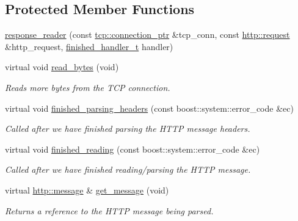 \subsection*{Protected Member Functions}
\begin{DoxyCompactItemize}
\item 
\hyperlink{classpion_1_1http_1_1response__reader_adb7aa322ee7f9073b748a28079935255}{response\-\_\-reader} (const \hyperlink{namespacepion_1_1tcp_a6c9b7497068009f6d81d95ec0b0627d6}{tcp\-::connection\-\_\-ptr} \&tcp\-\_\-conn, const \hyperlink{classpion_1_1http_1_1request}{http\-::request} \&http\-\_\-request, \hyperlink{classpion_1_1http_1_1response__reader_a5ca8a2f566ad6c5f6c6ae264d557944e}{finished\-\_\-handler\-\_\-t} handler)
\item 
virtual void \hyperlink{classpion_1_1http_1_1response__reader_a538144396cd3744d01972fe857902c06}{read\-\_\-bytes} (void)
\begin{DoxyCompactList}\small\item\em Reads more bytes from the T\-C\-P connection. \end{DoxyCompactList}\item 
virtual void \hyperlink{classpion_1_1http_1_1response__reader_a0108970a1783d3983dbfa16ba5d90e31}{finished\-\_\-parsing\-\_\-headers} (const boost\-::system\-::error\-\_\-code \&ec)
\begin{DoxyCompactList}\small\item\em Called after we have finished parsing the H\-T\-T\-P message headers. \end{DoxyCompactList}\item 
virtual void \hyperlink{classpion_1_1http_1_1response__reader_a775a668c0fa10535ca7bf28103b1fdc6}{finished\-\_\-reading} (const boost\-::system\-::error\-\_\-code \&ec)
\begin{DoxyCompactList}\small\item\em Called after we have finished reading/parsing the H\-T\-T\-P message. \end{DoxyCompactList}\item 
virtual \hyperlink{classpion_1_1http_1_1message}{http\-::message} \& \hyperlink{classpion_1_1http_1_1response__reader_a9bd4bf810cb215ddf36f6cec31f5d078}{get\-\_\-message} (void)
\begin{DoxyCompactList}\small\item\em Returns a reference to the H\-T\-T\-P message being parsed. \end{DoxyCompactList}\end{DoxyCompactItemize}
